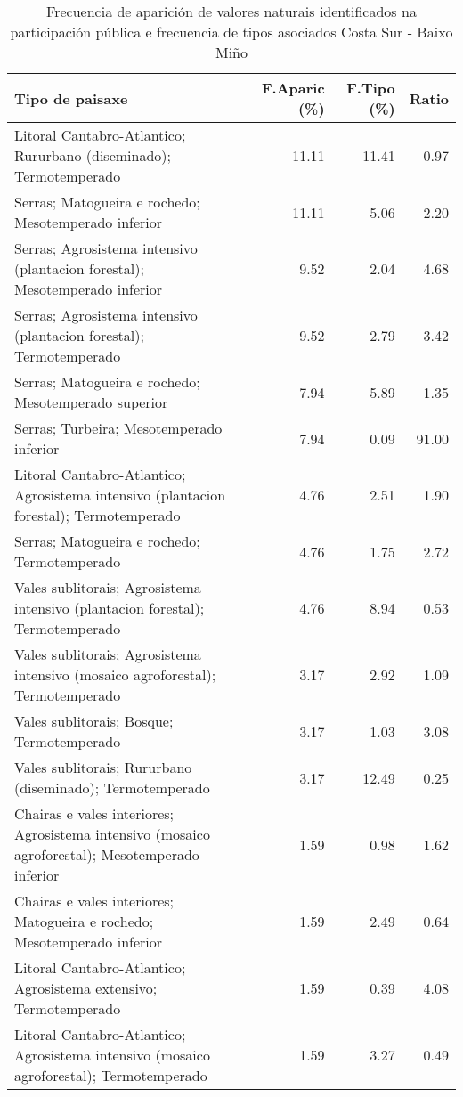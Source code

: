 \begin{table}[p]
\centering
\caption{Frecuencia de aparición de valores naturais identificados na participación pública e frecuencia de tipos asociados Costa Sur - Baixo Miño} 
\label{vsixotnat3}
\begin{tabular}{lrrr}
  \hline
Tipo de paisaxe & F.Aparic (\%) & F.Tipo (\%) & Ratio \\ 
  \hline
Litoral Cantabro-Atlantico; Rururbano (diseminado); Termotemperado & 11.11 & 11.41 & 0.97 \\ 
  Serras; Matogueira e rochedo; Mesotemperado inferior & 11.11 & 5.06 & 2.20 \\ 
  Serras; Agrosistema intensivo (plantacion forestal); Mesotemperado inferior & 9.52 & 2.04 & 4.68 \\ 
  Serras; Agrosistema intensivo (plantacion forestal); Termotemperado & 9.52 & 2.79 & 3.42 \\ 
  Serras; Matogueira e rochedo; Mesotemperado superior & 7.94 & 5.89 & 1.35 \\ 
  Serras; Turbeira; Mesotemperado inferior & 7.94 & 0.09 & 91.00 \\ 
  Litoral Cantabro-Atlantico; Agrosistema intensivo (plantacion forestal); Termotemperado & 4.76 & 2.51 & 1.90 \\ 
  Serras; Matogueira e rochedo; Termotemperado & 4.76 & 1.75 & 2.72 \\ 
  Vales sublitorais; Agrosistema intensivo (plantacion forestal); Termotemperado & 4.76 & 8.94 & 0.53 \\ 
  Vales sublitorais; Agrosistema intensivo (mosaico agroforestal); Termotemperado & 3.17 & 2.92 & 1.09 \\ 
  Vales sublitorais; Bosque; Termotemperado & 3.17 & 1.03 & 3.08 \\ 
  Vales sublitorais; Rururbano (diseminado); Termotemperado & 3.17 & 12.49 & 0.25 \\ 
  Chairas e vales interiores; Agrosistema intensivo (mosaico agroforestal); Mesotemperado inferior & 1.59 & 0.98 & 1.62 \\ 
  Chairas e vales interiores; Matogueira e rochedo; Mesotemperado inferior & 1.59 & 2.49 & 0.64 \\ 
  Litoral Cantabro-Atlantico; Agrosistema extensivo; Termotemperado & 1.59 & 0.39 & 4.08 \\ 
  Litoral Cantabro-Atlantico; Agrosistema intensivo (mosaico agroforestal); Termotemperado & 1.59 & 3.27 & 0.49 \\ 

\end{tabular}
\end{table}
